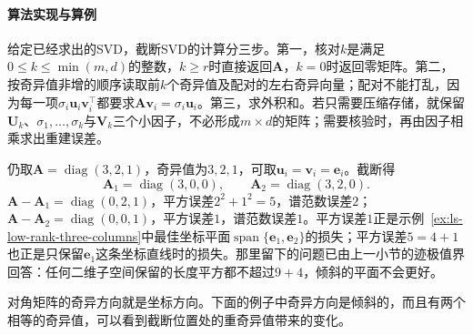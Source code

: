 \paragraph{算法实现与算例}

给定已经求出的SVD，截断SVD的计算分三步。第一，核对$k$是满足$0\leq k\leq\min(m,d)$的整数，$k\geq r$时直接返回$\bm A$，$k=0$时返回零矩阵。第二，按奇异值非增的顺序读取前$k$个奇异值及配对的左右奇异向量；配对不能打乱，因为每一项$\sigma_i\bm u_i\bm v_i^\top$都要求$\bm A\bm v_i=\sigma_i\bm u_i$。第三，求外积和。若只需要压缩存储，就保留$\bm U_k$、$\sigma_1,\ldots,\sigma_k$与$\bm V_k$三个小因子，不必形成$m\times d$的矩阵；需要核验时，再由因子相乘求出重建误差。

\begin{example}[对角矩阵的截断]
\label{ex:ls-truncated-svd-diagonal}
仍取$\bm A=\operatorname{diag}(3,2,1)$，奇异值为$3,2,1$，可取$\bm u_i=\bm v_i=\bm e_i$。截断得
\[
 \bm A_1=\operatorname{diag}(3,0,0),\qquad\bm A_2=\operatorname{diag}(3,2,0).
\]
$\bm A-\bm A_1=\operatorname{diag}(0,2,1)$，平方误差$2^2+1^2=5$，谱范数误差$2$；$\bm A-\bm A_2=\operatorname{diag}(0,0,1)$，平方误差$1$，谱范数误差$1$。平方误差$1$正是示例~\ref{ex:ls-low-rank-three-columns}中最佳坐标平面$\operatorname{span}\{\bm e_1,\bm e_2\}$的损失；平方误差$5=4+1$也正是只保留$\bm e_1$这条坐标直线时的损失。那里留下的问题已由上一小节的迹极值界回答：任何二维子空间保留的长度平方都不超过$9+4$，倾斜的平面不会更好。
\end{example}

对角矩阵的奇异方向就是坐标方向。下面的例子中奇异方向是倾斜的，而且有两个相等的奇异值，可以看到截断位置处的重奇异值带来的变化。

